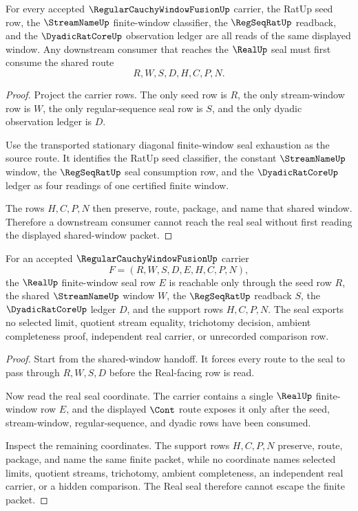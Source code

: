 \begin{theorem}
\label{thm:regular-cauchy-window-fusion-shared-window-handoff}
For every accepted $\RegularCauchyWindowFusionUp$ carrier, the RatUp seed row, the $\StreamNameUp$ finite-window classifier, the $\RegSeqRatUp$ readback, and the $\DyadicRatCoreUp$ observation ledger are all reads of the same displayed window. Any downstream consumer that reaches the $\RealUp$ seal must first consume the shared route
$$
R,W,S,D,H,C,P,N.
$$
\end{theorem}
\begin{proof}
Project the carrier rows. The only seed row is $R$, the only stream-window row is $W$, the only regular-sequence seal row is $S$, and the only dyadic observation ledger is $D$.

Use the transported stationary diagonal finite-window seal exhaustion as the source route. It identifies the RatUp seed classifier, the constant $\StreamNameUp$ window, the $\RegSeqRatUp$ seal consumption row, and the $\DyadicRatCoreUp$ ledger as four readings of one certified finite window.

The rows $H,C,P,N$ then preserve, route, package, and name that shared window. Therefore a downstream consumer cannot reach the real seal without first reading the displayed shared-window packet.
\end{proof}

\begin{theorem}
\label{thm:regular-cauchy-window-fusion-real-seal-nonescape}
For an accepted $\RegularCauchyWindowFusionUp$ carrier
$$
F=(R,W,S,D,E,H,C,P,N),
$$
the $\RealUp$ finite-window seal row $E$ is reachable only through the seed row $R$, the shared $\StreamNameUp$ window $W$, the $\RegSeqRatUp$ readback $S$, the $\DyadicRatCoreUp$ ledger $D$, and the support rows $H,C,P,N$. The seal exports no selected limit, quotient stream equality, trichotomy decision, ambient completeness proof, independent real carrier, or unrecorded comparison row.
\end{theorem}
\begin{proof}
Start from the shared-window handoff. It forces every route to the seal to pass through $R,W,S,D$ before the Real-facing row is read.

Now read the real seal coordinate. The carrier contains a single $\RealUp$ finite-window row $E$, and the displayed $\Cont$ route exposes it only after the seed, stream-window, regular-sequence, and dyadic rows have been consumed.

Inspect the remaining coordinates. The support rows $H,C,P,N$ preserve, route, package, and name the same finite packet, while no coordinate names selected limits, quotient streams, trichotomy, ambient completeness, an independent real carrier, or a hidden comparison. The Real seal therefore cannot escape the finite packet.
\end{proof}

